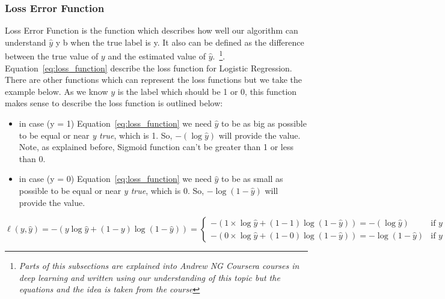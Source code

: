 \subsubsection{Loss Error Function}
Loss Error Function is the function which describes how well our algorithm can understand $\widehat{y}$ y b when the true label is y. It also can be defined as the difference between the true value of $y$ and the estimated value of $\widehat{y}$.~\footnote{\textit{Parts of this subsections are explained into Andrew NG Coursera courses in deep learning and written using our understanding of this topic but the equations and the idea is taken from the course}}. Equation~\eqref{eq:loss_function} describe the loss function for Logistic Regression. There are other functions which can represent the loss functions but we take the example below. As we know $y$ is the label which should be 1 or 0, this function makes sense to describe the loss function is outlined below:%
\begin{itemize}
\item in case (y = 1) Equation~\eqref{eq:loss_function} we need $\widehat{y}$ to be as big as possible to be equal or near \textit{y true}, which is 1. So, $ - (\log \widehat{y} )$ will provide the value. Note, as explained before, Sigmoid function can't be greater than 1 or less than 0. 
\item in case (y = 0) Equation~\eqref{eq:loss_function} we need $\widehat{y}$ to be as small as possible to be equal or near \textit{y true}, which is 0. So, $- \log (1-\widehat{y})$ will provide the value. 
\end{itemize}%
%
\begin{equation}
 \label{eq:loss_function}
  \ell(y,\widehat{y}) = - (y \log \widehat{y} + (1-y) \log (1-\widehat{y})) =  \begin{cases}
- (1\times \log \widehat{y} + (1-1) \log (1-\widehat{y})) = - (\log \widehat{y} ) & \mbox{if }  y = 1\\
- (0\times \log \widehat{y} + (1-0) \log (1-\widehat{y})) = - \log (1-\widehat{y}) & \mbox{if } y = 0
\end{cases}
\end{equation}%
%
%
